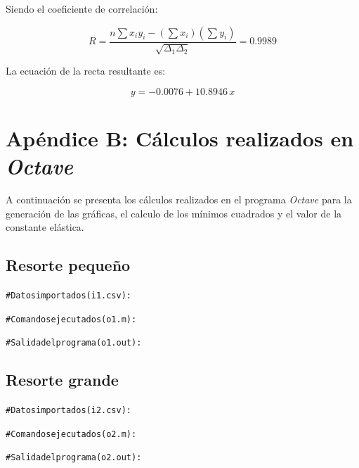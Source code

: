 \documentclass[letter,11pt]{article}
\begin{document}
Siendo el coeficiente de correlación:

\begin{equation*}
    R = \frac{n \sum x_i y_i - (\sum x_i)(\sum y_i)}{\sqrt{\Delta_1 \Delta_2}}
      = 0.9989
\end{equation*}
\vspace{0.10cm}

La ecuación de la recta resultante es:

\begin{equation*}
    y = -0.0076 + 10.8946\,x
\end{equation*}
\vspace{0.10cm}

\newpage
\section*{Apéndice B: Cálculos realizados en \emph{Octave}}

A continuación se presenta los cálculos realizados en el programa \emph{Octave}
para la generación de las gráficas, el calculo de los mínimos cuadrados y el
valor de la constante elástica.

\subsection{Resorte pequeño}
\begin{shaded}
\begin{alltt}
\footnotesize
\# Datos importados (i1.csv):

\# Comandos ejecutados (o1.m):



\# Salida del programa (o1.out):

\normalsize
\end{alltt}
\end{shaded}

\subsection{Resorte grande}
\begin{shaded}
\begin{alltt}
\footnotesize
\# Datos importados (i2.csv):

\# Comandos ejecutados (o2.m):



\# Salida del programa (o2.out):

\normalsize
\end{alltt}
\end{shaded}
\end{document}
